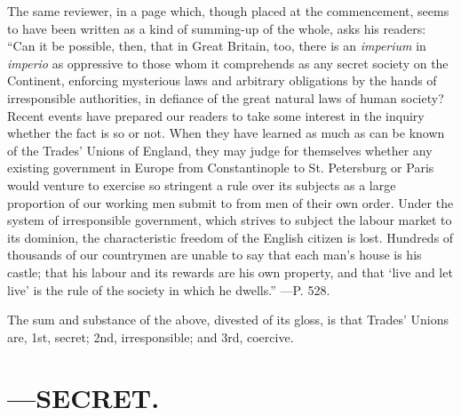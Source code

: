 The same reviewer, in a page which, though placed at the commencement,
seems to have been written as a kind of summing-up of the whole, asks
his readers: ``Can it be possible, then, that in Great Britain, too,
there is an \textit{imperium} in \textit{imperio} as oppressive to those
whom it comprehends as any secret society on the Continent, enforcing
mysterious laws and arbitrary obligations by the hands of irresponsible
authorities, in defiance of the great natural laws of human society?
Recent events have prepared our readers to take some interest in the
inquiry whether the fact is so or not. When they have learned as much as
can be known of the Trades' Unions of England, they may judge for
themselves whether any existing government in Europe from Constantinople
to St. Petersburg or Paris would venture to exercise so stringent a rule
over its subjects as a large proportion of our working men submit to
from men of their own order. Under the system of irresponsible
government, which strives to subject the labour market to its dominion,
the characteristic freedom of the English citizen is lost. Hundreds of
thousands of our countrymen are unable to say that each man's house is
his castle; that his labour and its rewards are his own property, and
that `live and let live' is the rule of the society in which he
dwells.'' ---P. 528.

The sum and substance of the above, divested of its gloss, is that
Trades' Unions are, 1st, secret; 2nd, irresponsible; and 3rd, coercive.

\section{---SECRET.}

